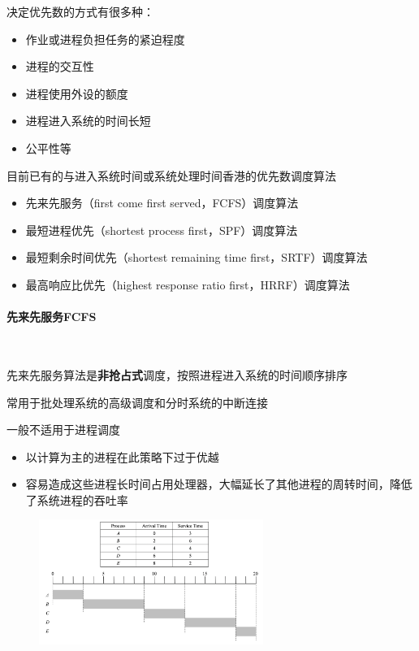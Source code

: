 \documentclass[cs4size,a4paper,10pt]{ctexart}
\begin{document}
	决定优先数的方式有很多种：
	\begin{itemize}
		\item 作业或进程负担任务的紧迫程度
		\item 进程的交互性
		\item 进程使用外设的额度
		\item 进程进入系统的时间长短
		\item 公平性等
	\end{itemize}

	目前已有的与进入系统时间或系统处理时间香港的优先数调度算法
	\begin{itemize}
		\item 先来先服务（first come first served，FCFS）调度算法
		\item 最短进程优先（shortest process first，SPF）调度算法
		\item 最短剩余时间优先（shortest remaining time first，SRTF）调度算法
		\item 最高响应比优先（highest response ratio first，HRRF）调度算法
	\end{itemize}

	\paragraph{先来先服务FCFS}~{}

	先来先服务算法是\textbf{非抢占式}调度，按照进程进入系统的时间顺序排序

	常用于批处理系统的高级调度和分时系统的中断连接

	一般不适用于进程调度
	\begin{itemize}
		\item 以计算为主的进程在此策略下过于优越
		\item 容易造成这些进程长时间占用处理器，大幅延长了其他进程的周转时间，降低了系统进程的吞吐率
	\end{itemize}

	\begin{figure}[H]
		\centering
		\includegraphics[width=0.65\textwidth]{img/FCFS}
	\end{figure}
\end{document}
